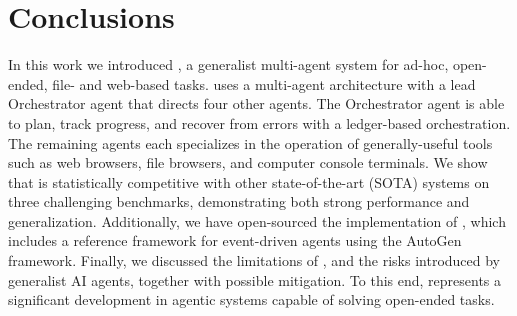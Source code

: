 \section{Conclusions}

In this work we introduced \team, a generalist multi-agent system for ad-hoc, open-ended, file- and web-based tasks. \team uses a multi-agent architecture with a lead Orchestrator agent that directs four other agents. The Orchestrator agent is able to plan, track progress, and recover from errors with a ledger-based  orchestration. The remaining agents each specializes in the operation of generally-useful tools such as web browsers, file browsers, and computer console terminals. We show that \team is statistically competitive with other state-of-the-art (SOTA) systems on three challenging benchmarks, demonstrating both strong performance and generalization. Additionally, we have open-sourced the implementation of \team, which includes a reference framework for event-driven agents using the AutoGen framework. Finally, we discussed the limitations of \team, and the risks introduced by generalist AI agents, together with possible mitigation. To this end, \team represents a significant development in agentic systems capable of solving open-ended tasks.
